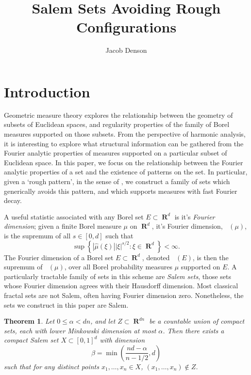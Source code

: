 \documentclass[12pt,reqno]{article}
\title{Salem Sets Avoiding Rough Configurations}
\author{Jacob Denson}
\numberwithin{equation}{section}
\DeclareMathOperator{\fordim}{\dim_{\mathbf{F}}}
\DeclareMathOperator{\RR}{\mathbf{R}}
\newtheorem{theorem}{Theorem}
\begin{document}
\maketitle

\section{Introduction}

Geometric measure theory explores the relationship between the geometry of subsets of Euclidean spaces, and regularity properties of the family of Borel measures supported on those subsets. From the perspective of harmonic analysis, it is interesting to explore what structural information can be gathered from the Fourier analytic properties of measures supported on a particular subset of Euclidean space. In this paper, we focus on the relationship between the Fourier analytic properties of a set and the existence of patterns on the set. In particular, given a `rough pattern', in the sense of \cite{OurPaper}, we construct a family of sets which generically avoids this pattern, and which supports measures with fast Fourier decay.

A useful statistic associated with any Borel set $E \subset \RR^d$ is it's \emph{Fourier dimension}; given a finite Borel measure $\mu$ on $\RR^d$, it's Fourier dimension, $\fordim(\mu)$, is the supremum of all $s \in [0,d]$ such that
%
\begin{equation} \label{fordim}
    \sup \left\{ |\widehat{\mu}(\xi)| |\xi|^{s/2} : \xi \in \RR^d \right\} < \infty.
\end{equation}
%
The Fourier dimension of a Borel set $E \subset \RR^d$, denoted $\fordim(E)$, is then the supremum of $\fordim(\mu)$, over all Borel probability measures $\mu$ supported on $E$. A particularly tractable family of sets in this scheme are \emph{Salem sets}, those sets whose Fourier dimension agrees with their Hausdorff dimension. Most classical fractal sets are not Salem, often having Fourier dimension zero. Nonetheless, the sets we construct in this paper are Salem.

\begin{theorem} \label{maintheorem}
    Let $0 \leq \alpha < dn$, and let $Z \subset \RR^{dn}$ be a countable union of compact sets, each with lower Minkowski dimension at most $\alpha$. Then there exists a compact Salem set $X \subset [0,1]^d$ with dimension
    \[ \beta = \min \left( \frac{nd - \alpha}{n-1/2}, d \right) \]
    such that for any distinct points $x_1, \dots, x_n \in X$, $(x_1, \dots, x_n) \not \in Z$.
\end{theorem}
\end{document}
